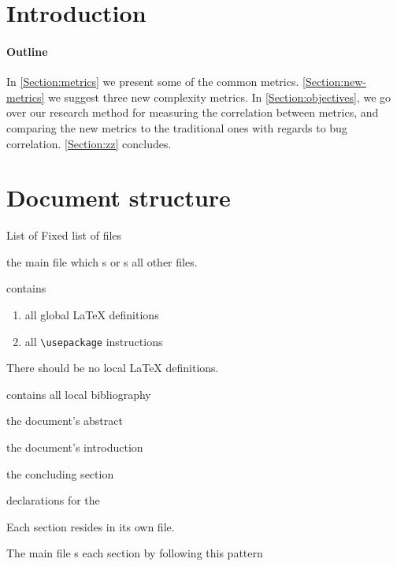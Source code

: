 \documentclass[12pt]{article}
\begin{document}
\maketitle
  
\begin{abstract}
	 
\end{abstract}

\section{Introduction}


\paragraph{Outline} 
In \autoref{Section:metrics} we present some of the common metrics.
\autoref{Section:new-metrics} we suggest three new complexity metrics.
In \autoref{Section:objectives}, we go over our research method for measuring
the correlation between metrics, and comparing the new metrics to the
traditional ones with regards to bug correlation.
\autoref{Section:zz} concludes. 

\section{Document structure}
\label{Section:structure}
List of 
Fixed list of files
\begin{description}
  \item[] the main file which \verb++s or \verb++s all other files.
  \item[] contains
        \begin{enumerate}
          \item all global \LaTeX{} definitions
          \item all \verb+\usepackage+  instructions
        \end{enumerate}
    There should be no local \LaTeX{} definitions.
  \item[] contains all local bibliography
  \item[] the document's abstract 
  \item[] the document's introduction 
  \item[] the concluding section 
  \item[] declarations  for the  
  \item Each section resides in its own file.
  \item The main file \verb++s each section by following this pattern
\end{description}



%
\end{document}
